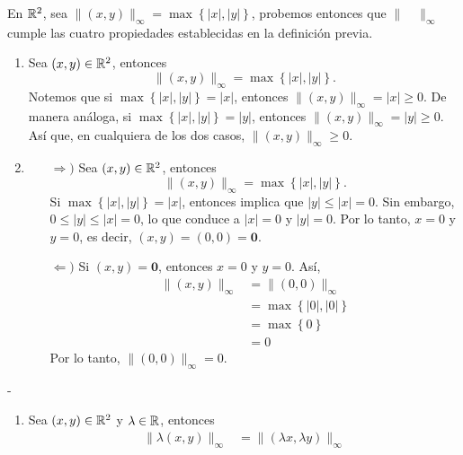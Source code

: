 \begin{example}
    En $\RR[2]$, sea $\| (x, y) \|_{\infty} = \max \left\{ |x|, |y| \right\}$, probemos entonces que $\| \quad \|_{\infty}$ cumple las cuatro propiedades establecidas en la definición previa.
    \begin{enumerate}[label=\roman*.]
        \item Sea $(x, y) \in \RR[2]$, entonces
        $$\| (x, y) \|_{\infty} = \max \left\{ |x|, |y| \right\}.$$
        Notemos que si $\max \left\{ |x|, |y| \right\} = |x|$, entonces $\| (x, y) \|_{\infty} = |x| \geq 0$. De manera análoga, si $\max \left\{ |x|, |y| \right\} = |y|$, entonces $\| (x, y) \|_{\infty} = |y| \geq 0$. Así que, en cualquiera de los dos casos, $\| (x, y) \|_{\infty} \geq 0$.
        \item \begin{enumerate}
            \item[$\Rightarrow)$] Sea $(x, y) \in \RR[2]$, entonces
            $$\| (x, y) \|_{\infty} = \max \left\{ |x|, |y| \right\}.$$
            Si $\max \left\{ |x|, |y| \right\} = |x|$, entonces implica que $|y| \leq |x| = 0$. Sin embargo, $0 \leq |y| \leq |x| = 0$, lo que conduce a $|x| = 0$ y $|y| = 0$. Por lo tanto, $x = 0$ y $y = 0$, es decir, $(x, y) = (0, 0) = \mathbf{0}$.
            \item[$\Leftarrow)$] Si $(x, y) = \mathbf{0}$, entonces $x = 0$ y $y = 0$. Así,
            \begin{align*}
                \| (x, y) \|_{\infty} & = \| (0, 0) \|_{\infty} \\
                & = \max \left\{ |0|, |0| \right\} \\
                & = \max \left\{ 0 \right\} \\
                & = 0
            \end{align*}
            Por lo tanto, $\| (0, 0) \|_{\infty} = 0$.
        \end{enumerate}
    \end{enumerate}
    \begin{adjustwidth}{0mm}{-\wholeMargin}
        \noindent\begin{minipage}[c]{8.2cm}
            \begin{enumerate}[label=\roman*.,start=3]
                \item Sea $(x, y) \in \RR[2]$ y $\lambda \in \RR$, entonces
                \begin{align*}
                    \| \lambda (x, y) \|_{\infty} & = \| (\lambda x, \lambda y) \|_{\infty} \\

\end{align*}
\end{enumerate}
\end{minipage}
\end{adjustwidth}
\end{example}
